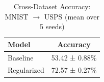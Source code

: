 
\begin{table}[h]
\centering
\caption{Cross-Dataset Accuracy: MNIST $\rightarrow$ USPS (mean over 5 seeds)}
\label{tab:extension2_usps}
\begin{tabular}{lc}
\toprule
\textbf{Model} & \textbf{Accuracy} \\
\midrule
Baseline & 53.42 ± 0.88\% \\
Regularized & 72.57 ± 0.27\% \\
\bottomrule
\end{tabular}
\end{table}
